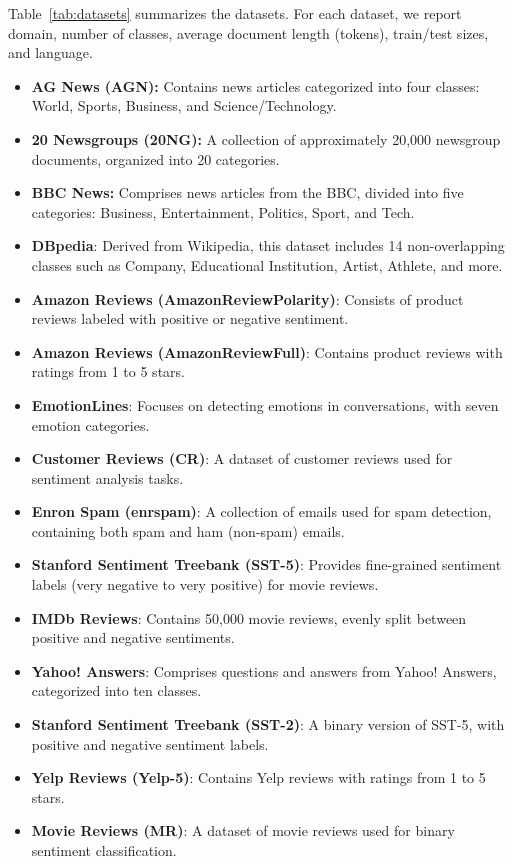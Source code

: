 \documentclass[]{politex-xico}
\begin{document}
Table~\ref{tab:datasets} summarizes the datasets. For each dataset, we report domain, number of classes, average document length (tokens), train/test sizes, and language.

\begin{itemize}

\item \textbf{AG News (AGN):} Contains news articles categorized into four classes: World, Sports, Business, and Science/Technology.
\item \textbf{20 Newsgroups (20NG):} A collection of approximately 20,000 newsgroup documents, organized into 20 categories.
\item \textbf{BBC News:} Comprises news articles from the BBC, divided into five categories: Business, Entertainment, Politics, Sport, and Tech.
\item \textbf{DBpedia}: Derived from Wikipedia, this dataset includes 14 non-overlapping classes such as Company, Educational Institution, Artist, Athlete, and more.
\item \textbf{Amazon Reviews (AmazonReviewPolarity)}: Consists of product reviews labeled with positive or negative sentiment.
\item \textbf{Amazon Reviews (AmazonReviewFull)}: Contains product reviews with ratings from 1 to 5 stars.
\item \textbf{EmotionLines}: Focuses on detecting emotions in conversations, with seven emotion categories.
\item \textbf{Customer Reviews (CR)}: A dataset of customer reviews used for sentiment analysis tasks.
\item \textbf{Enron Spam (enrspam)}: A collection of emails used for spam detection, containing both spam and ham (non-spam) emails.
\item \textbf{Stanford Sentiment Treebank (SST-5)}: Provides fine-grained sentiment labels (very negative to very positive) for movie reviews.
\item \textbf{IMDb Reviews}: Contains 50,000 movie reviews, evenly split between positive and negative sentiments.
\item \textbf{Yahoo! Answers}: Comprises questions and answers from Yahoo! Answers, categorized into ten classes.
\item \textbf{Stanford Sentiment Treebank (SST-2)}: A binary version of SST-5, with positive and negative sentiment labels.
\item \textbf{Yelp Reviews (Yelp-5)}: Contains Yelp reviews with ratings from 1 to 5 stars.
\item \textbf{Movie Reviews (MR)}: A dataset of movie reviews used for binary sentiment classification.

\end{itemize}
\end{document}
